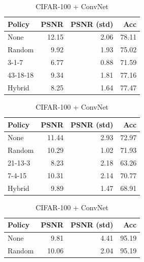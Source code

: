 \begin{table}[h]
    \centering
    \begin{subtable}[h]{0.21\textwidth}
      \begin{tabular}{lrrr}
            \hline
             Policy   &   PSNR &   PSNR (std) &   Acc \\
            \hline
             None     &       12.15 &       2.06 & 78.11 \\
             Random   &        9.92 &       1.93 & 75.02 \\
             3-1-7    &        6.77 &       0.88 & 71.59 \\
             43-18-18 &        9.34 &       1.81 & 77.16 \\
             Hybrid   &        8.25 &       1.64 & 77.47 \\
            \hline
        \end{tabular}
        \caption{CIFAR-100 + ResNet20}
    \end{subtable}
    \hspace{55mm}%
    \begin{subtable}[h]{0.21\textwidth}
        \centering
        \begin{tabular}{lrrr}
            \hline
             Policy   &   PSNR &   PSNR (std) &   Acc \\
            \hline
             None     &       11.44 &       2.93 & 72.97 \\
             Random   &       10.29 &       1.02 & 71.93 \\
             21-13-3  &        8.23 &       2.18 & 63.26 \\
             7-4-15   &       10.31 &       2.14 & 70.77 \\
             Hybrid   &        9.89 &       1.47 & 68.91 \\
            \hline
        \end{tabular}
        \caption{CIFAR-100 + ConvNet}
    \end{subtable}
    \vfill
    \begin{subtable}[h]{0.21\textwidth}
        \centering
        \begin{tabular}{lrrr}
            \hline
             Policy   &   PSNR &   PSNR (std) &   Acc \\
            \hline
             None     &        9.81 &       4.41 & 95.19 \\
             Random   &       10.06 &       2.04 & 95.19 \\

\end{tabular}
\end{subtable}
\end{table}
